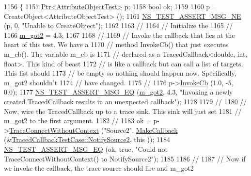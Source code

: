 \begin{DoxyCode}
1156 \{
1157   \hyperlink{classns3_1_1Ptr}{Ptr<AttributeObjectTest>} \hyperlink{lte__link__budget_8m_ac9de518908a968428863f829398a4e62}{p};
1158   \textcolor{keywordtype}{bool} ok;
1159 
1160   p = CreateObject<AttributeObjectTest> ();
1161   \hyperlink{group__testing_ga73d66fb0050a5111453fd144e767b91a}{NS\_TEST\_ASSERT\_MSG\_NE} (p, 0, \textcolor{stringliteral}{"Unable to CreateObject"});
1162 
1163   \textcolor{comment}{//}
1164   \textcolor{comment}{// Initialize the }
1165   \textcolor{comment}{//}
1166   \hyperlink{classTracedCallbackTestCase_a3a69dac6a5b1b0cf2828f5c3969c3a38}{m\_got2} = 4.3;
1167 
1168   \textcolor{comment}{//}
1169   \textcolor{comment}{// Invoke the callback that lies at the heart of this test.  We have a}
1170   \textcolor{comment}{// method InvokeCb() that just executes m\_cb().  The variable m\_cb is }
1171   \textcolor{comment}{// declared as a TracedCallback<double, int, float>.  This kind of beast}
1172   \textcolor{comment}{// is like a callback but can call a list of targets.  This list should}
1173   \textcolor{comment}{// be empty so nothing should happen now.  Specifically, m\_got2 shouldn't}
1174   \textcolor{comment}{// have changed.}
1175   \textcolor{comment}{//}
1176   p->\hyperlink{classAttributeObjectTest_a2a1a4729b1d8f1ff5baec7831abc3977}{InvokeCb} (1.0, -5, 0.0);
1177   \hyperlink{group__testing_ga2a9d78cffb3db8e867c35fff0b698cf5}{NS\_TEST\_ASSERT\_MSG\_EQ} (\hyperlink{classTracedCallbackTestCase_a3a69dac6a5b1b0cf2828f5c3969c3a38}{m\_got2}, 4.3, \textcolor{stringliteral}{"Invoking a newly created TracedCallback
       results in an unexpected callback"});
1178 
1179   \textcolor{comment}{//}
1180   \textcolor{comment}{// Now, wire the TracedCallback up to a trace sink.  This sink will just set}
1181   \textcolor{comment}{// m\_got2 to the first argument.}
1182   \textcolor{comment}{//}
1183   ok = p->\hyperlink{classns3_1_1ObjectBase_a1be45f6fd561e75dcac9dfa81b2b81e4}{TraceConnectWithoutContext} (\textcolor{stringliteral}{"Source2"}, 
      \hyperlink{group__makecallbackmemptr_ga9376283685aa99d204048d6a4b7610a4}{MakeCallback} (&\hyperlink{classTracedCallbackTestCase_a391631ebb2a227e01dc94f93e93dd354}{TracedCallbackTestCase::NotifySource2}, \textcolor{keyword}{this}
      ));
1184   \hyperlink{group__testing_ga2a9d78cffb3db8e867c35fff0b698cf5}{NS\_TEST\_ASSERT\_MSG\_EQ} (ok, \textcolor{keyword}{true}, \textcolor{stringliteral}{"Could not TraceConnectWithoutContext() to
       NotifySource2"});
1185 
1186   \textcolor{comment}{//}
1187   \textcolor{comment}{// Now if we invoke the callback, the trace source should fire and m\_got2}

\end{DoxyCode}
